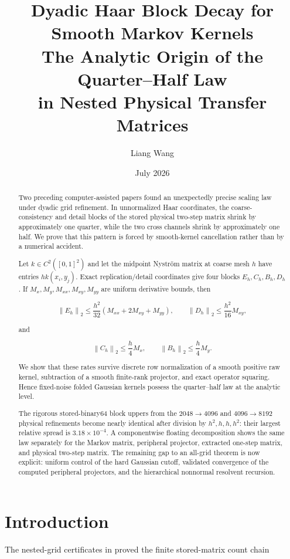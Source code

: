 \documentclass[11pt]{article}
\title{Dyadic Haar Block Decay for Smooth Markov Kernels\\
\large The Analytic Origin of the Quarter--Half Law\\
in Nested Physical Transfer Matrices}
\author{Liang Wang}
\date{July 2026}
\theoremstyle{definition}
\theoremstyle{remark}
\newcommand{\norm}[1]{\left\lVert #1\right\rVert}
\begin{document}
\maketitle

\begin{abstract}
Two preceding computer-assisted papers found an unexpectedly precise scaling
law under dyadic grid refinement.  In unnormalized Haar coordinates, the
coarse-consistency and detail blocks of the stored physical two-step matrix
shrink by approximately one quarter, while the two cross channels shrink by
approximately one half.  We prove that this pattern is forced by smooth-kernel
cancellation rather than by a numerical accident.

Let $k\in C^2([0,1]^2)$ and let the midpoint Nystr\"om matrix at coarse mesh
$h$ have entries $h k(x_i,y_j)$.  Exact replication/detail coordinates give
four blocks $E_h,C_h,B_h,D_h$.  If $M_x,M_y,M_{xx},M_{xy},M_{yy}$ are uniform
derivative bounds, then

\[
 \norm{E_h}_2\le\frac{h^2}{32}(M_{xx}+2M_{xy}+M_{yy}),\qquad
 \norm{D_h}_2\le\frac{h^2}{16}M_{xy},
\]

and

\[
 \norm{C_h}_2\le\frac h4M_x,\qquad
 \norm{B_h}_2\le\frac h4M_y.
\]

We show that these rates survive discrete row normalization of a smooth
positive raw kernel, subtraction of a smooth finite-rank projector, and exact
operator squaring.  Hence fixed-noise folded Gaussian kernels possess the
quarter--half law at the analytic level.

The rigorous stored-binary64 block uppers from the $2048\to4096$ and
$4096\to8192$ physical refinements become nearly identical after division by
$h^2,h,h,h^2$: their largest relative spread is $3.18\times10^{-4}$.  A
componentwise floating decomposition shows the same law separately for the
Markov matrix, peripheral projector, extracted one-step matrix, and physical
two-step matrix.  The remaining gap to an all-grid theorem is now explicit:
uniform control of the hard Gaussian cutoff, validated convergence of the
computed peripheral projectors, and the hierarchical nonnormal resolvent
recursion.
\end{abstract}

\section{Introduction}

The nested-grid certificates in \citet{WangNested2026,WangIterated2026}
proved the finite stored-matrix count chain
\end{document}
